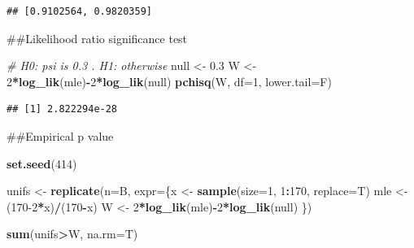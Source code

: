 \documentclass[
  11pt,
]{article}
\newenvironment{Shaded}{\begin{snugshade}}{\end{snugshade}}
\newcommand{\AttributeTok}[1]{\textcolor[rgb]{0.13,0.29,0.53}{#1}}
\newcommand{\CommentTok}[1]{\textcolor[rgb]{0.56,0.35,0.01}{\textit{#1}}}
\newcommand{\DecValTok}[1]{\textcolor[rgb]{0.00,0.00,0.81}{#1}}
\newcommand{\FloatTok}[1]{\textcolor[rgb]{0.00,0.00,0.81}{#1}}
\newcommand{\FunctionTok}[1]{\textcolor[rgb]{0.13,0.29,0.53}{\textbf{#1}}}
\newcommand{\NormalTok}[1]{#1}
\newcommand{\OtherTok}[1]{\textcolor[rgb]{0.56,0.35,0.01}{#1}}
\newcommand{\SpecialCharTok}[1]{\textcolor[rgb]{0.81,0.36,0.00}{\textbf{#1}}}
\newcommand{\StringTok}[1]{\textcolor[rgb]{0.31,0.60,0.02}{#1}}
\begin{document}
\begin{Shaded}
\end{Shaded}

\begin{verbatim}
## [0.9102564, 0.9820359]
\end{verbatim}

\#\#Likelihood ratio significance test

\begin{Shaded}
\begin{Highlighting}[]
\CommentTok{\# H0: psi is 0.3 . H1: otherwise}
\NormalTok{null }\OtherTok{\textless{}{-}} \FloatTok{0.3}
\NormalTok{W }\OtherTok{\textless{}{-}} \DecValTok{2}\SpecialCharTok{*}\FunctionTok{log\_lik}\NormalTok{(mle)}\SpecialCharTok{{-}}\DecValTok{2}\SpecialCharTok{*}\FunctionTok{log\_lik}\NormalTok{(null)}
\FunctionTok{pchisq}\NormalTok{(W, }\AttributeTok{df=}\DecValTok{1}\NormalTok{, }\AttributeTok{lower.tail=}\NormalTok{F)}
\end{Highlighting}
\end{Shaded}

\begin{verbatim}
## [1] 2.822294e-28
\end{verbatim}

\#\#Empirical p value

\begin{Shaded}
\begin{Highlighting}[]
\FunctionTok{set.seed}\NormalTok{(}\DecValTok{414}\NormalTok{)}

\NormalTok{unifs }\OtherTok{\textless{}{-}} \FunctionTok{replicate}\NormalTok{(}\AttributeTok{n=}\NormalTok{B, }\AttributeTok{expr=}\NormalTok{\{x }\OtherTok{\textless{}{-}} \FunctionTok{sample}\NormalTok{(}\AttributeTok{size=}\DecValTok{1}\NormalTok{, }\DecValTok{1}\SpecialCharTok{:}\DecValTok{170}\NormalTok{, }\AttributeTok{replace=}\NormalTok{T)}
\NormalTok{                    mle }\OtherTok{\textless{}{-}}\NormalTok{ (}\DecValTok{170{-}2}\SpecialCharTok{*}\NormalTok{x)}\SpecialCharTok{/}\NormalTok{(}\DecValTok{170}\SpecialCharTok{{-}}\NormalTok{x)}
\NormalTok{                    W }\OtherTok{\textless{}{-}} \DecValTok{2}\SpecialCharTok{*}\FunctionTok{log\_lik}\NormalTok{(mle)}\SpecialCharTok{{-}}\DecValTok{2}\SpecialCharTok{*}\FunctionTok{log\_lik}\NormalTok{(null)}
\NormalTok{                    \})}

\FunctionTok{sum}\NormalTok{(unifs}\SpecialCharTok{\textgreater{}}\NormalTok{W, }\AttributeTok{na.rm=}\NormalTok{T)}
\end{Highlighting}
\end{Shaded}
\end{document}
